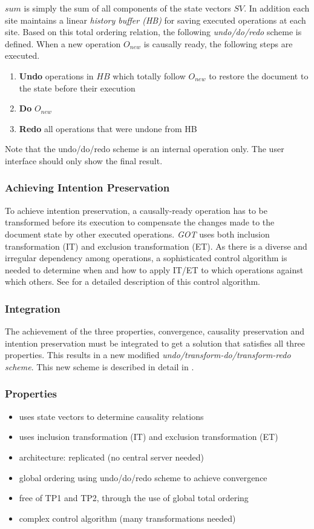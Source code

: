 $sum$ is simply the sum of all components of the state vectors $SV$. In addition each site maintains a linear \emph{history buffer (HB)} for saving executed operations at each site. Based on this total ordering relation, the following \emph{undo/do/redo} scheme is defined. When a new operation $O_{new}$ is causally ready, the following steps are executed.

\begin{enumerate}
 \item \textbf{Undo} operations in $HB$ which totally follow $O_{new}$ to 
       restore the document to the state before their execution
 \item \textbf{Do} $O_{new}$
 \item \textbf{Redo} all operations that were undone from HB
\end{enumerate}

Note that the undo/do/redo scheme is an internal operation only. The user interface should only show the final result.


\subsubsection{Achieving Intention Preservation}
To achieve intention preservation, a causally-ready operation has to be transformed before its execution to compensate the changes made to the document state by other executed operations. \emph{GOT} uses both inclusion transformation (IT) and exclusion transformation (ET). As there is a diverse and irregular dependency among operations, a sophisticated control algorithm is needed to determine when and how to apply IT/ET to which operations against which others. See \cite{sun98a} for a detailed description of this control algorithm.


\subsubsection{Integration}
The achievement of the three properties, convergence, causality preservation and intention preservation must be integrated to get a solution that satisfies all three properties. This results in a new modified \emph{undo/transform-do/transform-redo scheme}. This new scheme is described in detail in \cite{sun98b}.


\subsubsection{Properties}
\begin{itemize}
 \item uses state vectors to determine causality relations
 \item uses inclusion transformation (IT) and exclusion transformation (ET)
 \item architecture: replicated (no central server needed)
 \item global ordering using undo/do/redo scheme to achieve convergence
 \item free of TP1 and TP2, through the use of global total ordering
 \item complex control algorithm (many transformations needed)
\end{itemize}


